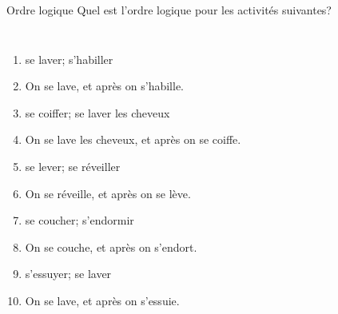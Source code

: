 \documentclass{beamer}
\begin{document}
  \begin{frame}{Ordre logique}
    Quel est l'ordre logique pour les activités suivantes?
    \begin{columns}
        {\scriptsize
        \begin{enumerate}
          \item se laver; s'habiller
          \item<2->[$\to$] On se lave, et après on s'habille.
          \item<3-> se coiffer; se laver les cheveux
          \item<4->[$\to$] On se lave les cheveux, et après on se coiffe.
          \item<5-> se lever; se réveiller
          \item<6->[$\to$] On se réveille, et après on se lève.
          \item<7-> se coucher; s'endormir
          \item<8->[$\to$] On se couche, et après on s'endort.
          \item<9-> s'essuyer; se laver
          \item<10->[$\to$] On se lave, et après on s'essuie.
        \end{enumerate}
        }
        \begin{minipage}[c][0.6\textheight]{\linewidth}
          \begin{center}
          \end{center}
        \end{minipage}
    \end{columns}
  \end{frame}
\end{document}
